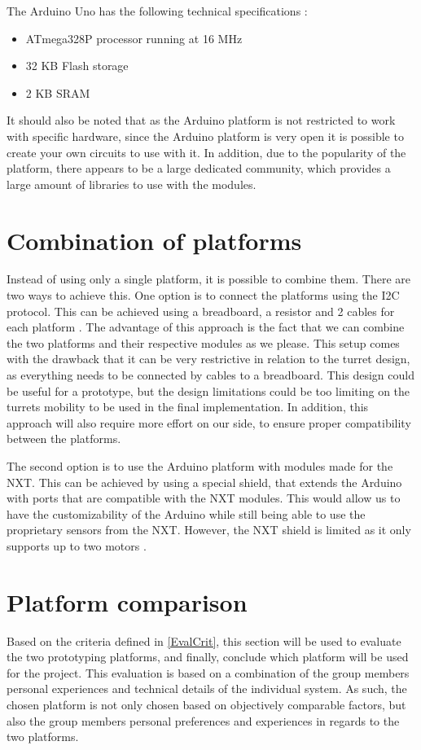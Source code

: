 The Arduino Uno has the following technical specifications \citep{UNOSpecs}:

\begin{itemize}
  \item ATmega328P processor running at 16 MHz 
  \item 32 KB Flash storage
  \item 2 KB SRAM
\end{itemize}

It should also be noted that as the Arduino platform is not restricted to work
with specific hardware, since the Arduino platform is very open it is possible
to create your own circuits to use with it. In addition, due to the popularity
of the platform, there appears to be a large dedicated community, which provides
a large amount of libraries to use with the modules. 

\section{Combination of platforms}\label{CombPlat}
Instead of using only a single platform, it is possible to combine them. There
are two ways to achieve this. One option is to connect the platforms using the
I2C protocol. This can be achieved using a breadboard, a
resistor and 2 cables for each platform \citep{ArduinoNXT}. The advantage of
this approach is the fact that we can combine the two platforms and their
respective modules as we please. This setup comes with the drawback that it can
be very restrictive in relation to the turret design, as everything needs to be
connected by cables to a breadboard. This design could be useful for a
prototype, but the design limitations could be too limiting on the turrets
mobility to be used in the final implementation. In addition, this approach will
also require more effort on our side, to ensure proper compatibility between the
platforms. \nl

The second option is to use the Arduino platform with modules made
for the NXT. This can be achieved by using a special shield, that
extends the Arduino with ports that are compatible with the NXT modules. This
would allow us to have the customizability of the Arduino while still being able
to use the proprietary sensors from the NXT. However, the NXT shield is limited
as it only supports up to two motors \citep{NXTShield}. 

\section{Platform comparison}
Based on the criteria defined in \autoref{EvalCrit}, this section will be used
to evaluate the two prototyping platforms, and finally, conclude which platform
will be used for the \name project. This evaluation is based on a combination of
the group members personal experiences and technical details of the individual
system.
As such, the chosen platform is not only chosen based on objectively comparable
factors, but also the group members personal preferences and experiences in
regards to the two platforms.

